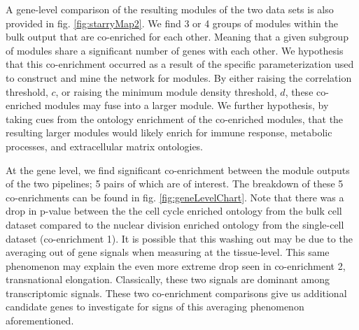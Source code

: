 \documentclass[10pt,letterpaper]{article}
\begin{document}
A gene-level comparison of the resulting modules of the two data sets is also provided in fig. \ref{fig:starryMap2}. We find 3 or 4 groups of modules within the bulk output that are co-enriched for each other. Meaning that a given subgroup of modules share a significant number of genes with each other. We hypothesis that this co-enrichment occurred as a result of the specific parameterization used to construct and mine the network for modules. By either raising the correlation threshold, $c$, or raising the minimum module density threshold, $d$, these co-enriched modules may fuse into a larger module. We further hypothesis, by taking cues from the ontology enrichment of the co-enriched modules, that the resulting larger modules would likely enrich for immune response, metabolic processes, and extracellular matrix ontologies. 

At the gene level, we find significant co-enrichment between the module outputs of the two pipelines; 5 pairs of which are of interest. The breakdown of these 5 co-enrichments can be found in fig. \ref{fig:geneLevelChart}. Note that there was a drop in p-value between the the cell cycle enriched ontology from the bulk cell dataset compared to the nuclear division enriched ontology from the single-cell dataset (co-enrichment 1). It is possible that this washing out may be due to the averaging out of gene signals when measuring at the tissue-level. This same phenomenon may explain the even more extreme drop seen in co-enrichment 2, transnational elongation. Classically, these two signals are dominant among transcriptomic signals. These two co-enrichment comparisons give us additional candidate genes to investigate for signs of this averaging phenomenon aforementioned.
\end{document}
